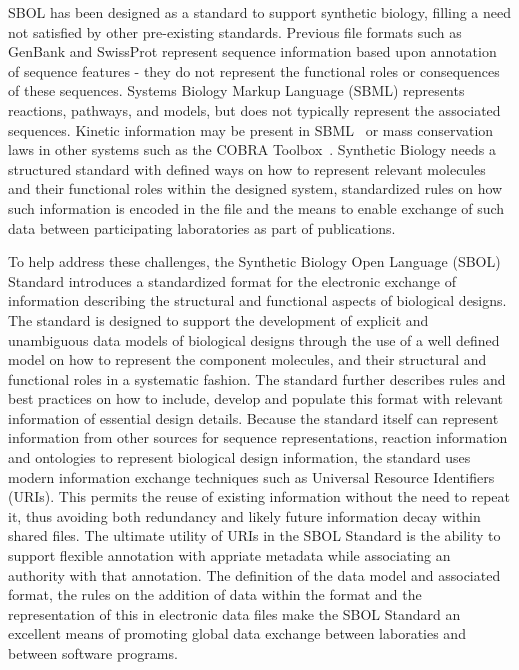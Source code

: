 SBOL has been designed as a standard to support synthetic biology, filling a need not satisfied by other pre-existing standards. Previous file formats such as GenBank and SwissProt represent sequence information based upon annotation of sequence features - they do not represent the functional roles or consequences of these sequences. Systems Biology Markup Language (SBML) represents reactions, pathways, and models, but does not typically represent the associated sequences.  Kinetic information may be present in SBML~\cite{SBML} or mass conservation laws in other systems such as the COBRA Toolbox~\cite{COBRA}. Synthetic Biology needs a structured standard with defined ways on how to represent relevant molecules and their functional roles within the designed system, standardized rules on how such information is encoded in the file and the means to enable exchange of such data between participating laboratories as part of publications. 

To help address these challenges, the Synthetic Biology Open Language (SBOL) Standard introduces a standardized format for the electronic exchange of information describing the structural and functional aspects of biological designs. 
The standard is designed to support the development of explicit and unambiguous data models of biological designs through the use of a well defined model on how to represent the component molecules, and their structural and functional roles in a systematic fashion. 
The standard further describes rules and best practices on how to include, develop and populate this format with relevant information of essential design details. 
Because the standard itself can represent information from other sources for sequence representations, reaction information and ontologies to represent biological design information, the standard uses modern information exchange techniques such as Universal Resource Identifiers (URIs). This permits the reuse of existing information without the need to repeat it, thus avoiding both redundancy and likely future information decay within shared files. The ultimate utility of URIs in the SBOL Standard is the ability to support flexible annotation with appriate metadata while associating an authority with that annotation. The definition of the data model and associated format, the rules on the addition of data within the format and the representation of this in electronic data files make the SBOL Standard an excellent means of promoting global data exchange between laboraties and between software programs.

